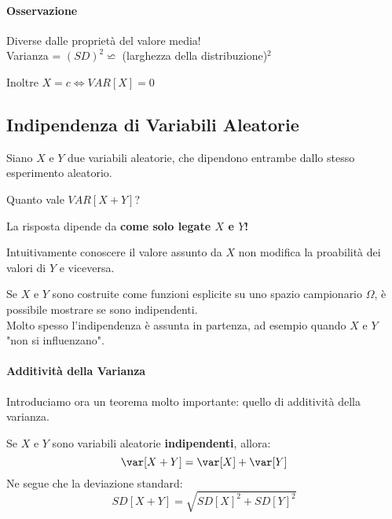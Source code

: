 	\paragraph{Osservazione} Diverse dalle proprietà del valore media!
	\\ Varianza = $(SD)^2 \backsimeq $ (larghezza della distribuzione)$^2$
	\begin{center}
		Inoltre $X = c \Leftrightarrow VAR[X] = 0$
	\end{center}


	\subsection{Indipendenza di Variabili Aleatorie}
	Siano $X$ e $Y$ due variabili aleatorie, che dipendono entrambe dallo
	stesso esperimento aleatorio.
	\begin{center}
		Quanto vale $VAR[X+Y]$?
	\end{center}
	La risposta dipende da \textbf{come solo legate $X$ e $Y$!}

	Intuitivamente conoscere il valore assunto da $X$ non modifica la proabilità dei valori
	di $Y$ e viceversa.

	Se $X$ e $Y$ sono costruite come funzioni esplicite su uno spazio campionario $\Omega$,
	è possibile mostrare se sono indipendenti.
	\\ Molto spesso l'indipendenza è assunta in partenza, ad esempio quando $X$ e $Y$ "non si influenzano".

	\paragraph{Additività della Varianza}
	Introduciamo ora un teorema molto importante: quello di additività della varianza.

	Se $X$ e $Y$ sono variabili aleatorie \textbf{indipendenti}, allora:
	\[
		\var[X+Y] = \var[X] + \var[Y]
	\]
	Ne segue che la deviazione standard:
	\[
		SD[X+Y] = \sqrt{SD[X]^2 + SD[Y]^2}
	\]

